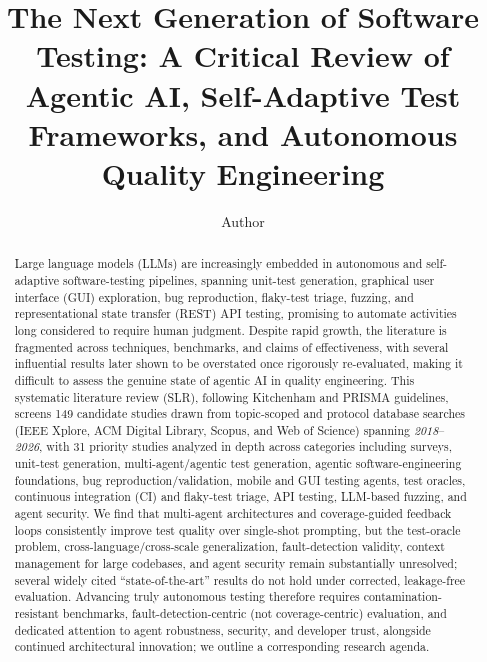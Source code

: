 \documentclass[a4paper,fleqn,review,12pt]{cas-sc}
\begin{document}
\let\WriteBookmarks\relax
\def\floatpagepagefraction{1}
\def\textpagefraction{.001}


\title[mode=title]{The Next Generation of Software Testing: A Critical Review of
  Agentic AI, Self-Adaptive Test Frameworks, and Autonomous Quality Engineering}

\author{Author}
\cormark[1]


\begin{abstract}
Large language models (LLMs) are increasingly embedded in autonomous and
self-adaptive software-testing pipelines, spanning unit-test generation,
graphical user interface (GUI) exploration, bug reproduction, flaky-test triage,
fuzzing, and representational state transfer (REST) API testing, promising to
automate activities long considered to require human judgment. Despite rapid
growth, the literature is fragmented across techniques, benchmarks, and claims
of effectiveness, with several influential results later shown to be overstated
once rigorously re-evaluated, making it difficult to assess the genuine state
of agentic AI in quality engineering. This systematic literature review (SLR),
following Kitchenham and PRISMA guidelines, screens 149 candidate studies drawn
from topic-scoped and protocol database searches (IEEE Xplore, ACM Digital
Library, Scopus, and Web of Science) spanning \textit{2018}--\textit{2026}, with
31 priority studies analyzed in depth across categories including surveys,
unit-test generation, multi-agent/agentic test generation, agentic
software-engineering foundations, bug reproduction/validation, mobile and GUI
testing agents, test oracles, continuous integration (CI) and flaky-test triage,
API testing, LLM-based fuzzing, and agent security. We find that multi-agent
architectures and coverage-guided feedback loops consistently improve test
quality over single-shot prompting, but the test-oracle problem,
cross-language/cross-scale generalization, fault-detection validity, context
management for large codebases, and agent security remain substantially
unresolved; several widely cited ``state-of-the-art'' results do not hold under
corrected, leakage-free evaluation. Advancing truly autonomous testing
therefore requires contamination-resistant benchmarks, fault-detection-centric
(not coverage-centric) evaluation, and dedicated attention to agent robustness,
security, and developer trust, alongside continued architectural innovation;
we outline a corresponding research agenda.
\end{abstract}
\end{document}
